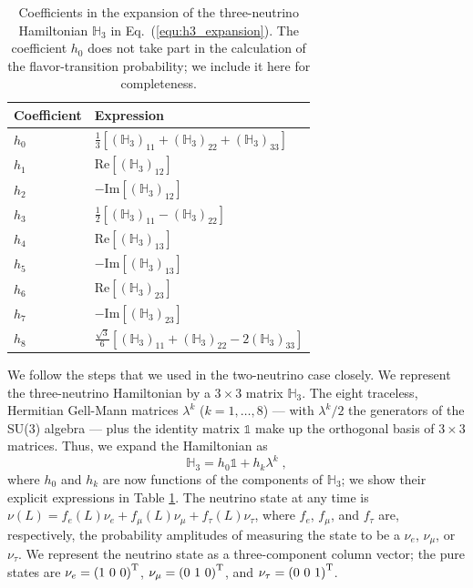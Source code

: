 \documentclass[final,5p,times,twocolumn]{elsarticle}
\newcommand{\eq}{Eq.}
\newcommand{\equ}[1]{\eq~(\ref{equ:#1})}
\begin{document}
{\def\arraystretch{1.2}
\begin{table}[t!]
  \begin{tabular}{ll}
   Coefficient & Expression \\
   \hline
   $h_0$ & $\frac{1}{3}\left[\left(\mathbb{H}_3\right)_{11}+\left(\mathbb{H}_3\right)_{22}+\left(\mathbb{H}_3\right)_{33}\right]$ \\
   $h_1$ & $\text{Re}\left[{\left(\mathbb{H}_3\right)_{12}}\right]$ \\
   $h_2$ & $-\text{Im}\left[{\left(\mathbb{H}_3\right)_{12}}\right]$ \\
   $h_3$ & $\frac{1}{2}\left[\left(\mathbb{H}_3\right)_{11}-\left(\mathbb{H}_3\right)_{22} \right]$ \\
   $h_4$ & $\text{Re}\left[{\left(\mathbb{H}_3\right)_{13}}\right]$ \\
   $h_5$ & $-\text{Im}\left[{\left(\mathbb{H}_3\right)_{13}}\right]$ \\
   $h_6$ & $\text{Re}\left[{\left(\mathbb{H}_3\right)_{23}}\right]$ \\
   $h_7$ & $-\text{Im}\left[{\left(\mathbb{H}_3\right)_{23}}\right]$ \\
   $h_8$ & $\frac{\sqrt{3}}{6}\left[\left(\mathbb{H}_3\right)_{11}+\left(\mathbb{H}_3\right)_{22}-2\left(\mathbb{H}_3\right)_{33}\right]$ 
  \end{tabular}
  \caption{\label{tab:h3_coefficients}Coefficients in the expansion of the three-neutrino Hamiltonian $\mathbb{H}_3$ in \equ{h3_expansion}.  The coefficient $h_0$ does not take part in the calculation of the flavor-transition probability; we include it here for completeness.}
\end{table}
}

We follow the steps that we used in the two-neutrino case closely.  We represent the three-neutrino Hamiltonian by a $3 \times 3$ matrix $\mathbb{H}_3$.  The eight traceless, Hermitian Gell-Mann matrices $\lambda^k$ ($k=1,\ldots,8$) --- with $\lambda^k/2$ the generators of the SU(3) algebra --- plus the identity matrix $\mathbb{1}$ make up the orthogonal basis of $3 \times 3$ matrices.  Thus, we expand the Hamiltonian as
\begin{equation}
 \label{equ:h3_expansion}
 \mathbb{H}_3 = h_0 \mathbb{1} + h_k \lambda^k \;,
\end{equation}
where $h_0$ and $h_k$ are now functions of the components of $\mathbb{H}_3$; we show their explicit expressions in Table \ref{tab:h3_coefficients}.  The neutrino state at any time is $\nu(L) = f_e(L) \nu_e + f_\mu(L) \nu_\mu + f_\tau(L) \nu_\tau$, where $f_e$, $f_\mu$, and $f_\tau$ are, respectively, the probability amplitudes of measuring the state to be a $\nu_e$, $\nu_\mu$, or $\nu_\tau$.  We represent the neutrino state as a three-component column vector; the pure states are $\nu_e = \left(1~0~0\right)^{\rm T}$, $\nu_\mu=\left(0~1~0\right)^{\rm T}$, and $\nu_\tau=\left(0~0~1\right)^{\rm T}$. 
\end{document}
